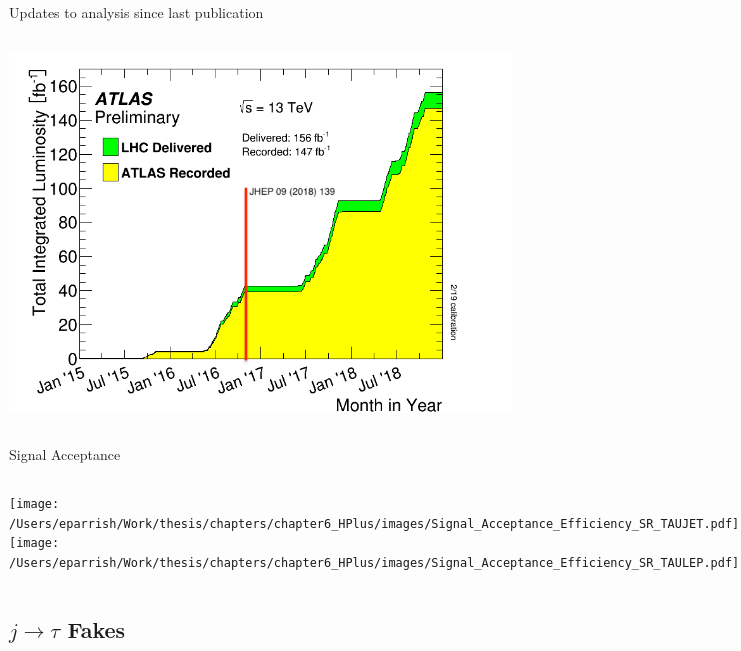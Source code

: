 \documentclass[aspectratio=169,xcolor=table]{beamer}
\begin{document}
\begin{frame}[t]{Updates to analysis since last publication}
\begin{columns}
      \includegraphics[width=1.1\textwidth,keepaspectratio=true]{intlumivstimeRun2.png}
      \end{columns}
    \end{frame}

    \begin{frame}[t]{Signal Acceptance}
      \begin{columns}

        \texttt{[image: /Users/eparrish/Work/thesis/chapters/chapter6\_HPlus/images/Signal\_Acceptance\_Efficiency\_SR\_TAUJET.pdf]}
        \texttt{[image: /Users/eparrish/Work/thesis/chapters/chapter6\_HPlus/images/Signal\_Acceptance\_Efficiency\_SR\_TAULEP.pdf]}

      \end{columns}
    \end{frame}

  \subsection{$j \rightarrow \tau$ Fakes}
\end{document}
